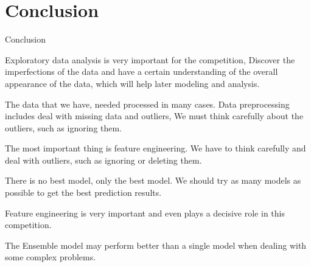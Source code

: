 \documentclass[
 size=12pt,
 paper=smartboard, %
 mode=present, %
 display=slides, %
 style=tuliplab,  %
 pauseslide,
 fleqn,leqno,clock]{powerdot}
\begin{document}
\section{Conclusion}

\begin{slide}[toc=,bm=]{Conclusion}
	\begin{description}
		\item Exploratory data analysis is
		      very important for the competition,
		      Discover the imperfections of the
		      data and have a certain understanding
		      of the overall appearance of the data,
		      which will help later modeling and analysis.
		\item The data that we have,
		      needed processed in many cases.
		      Data preprocessing includes
		      deal with missing data and outliers,
		      We must think carefully about the outliers,
		      such as ignoring them.
		\item The most important thing is
		      feature engineering.
		      We have to think carefully and
		      deal with outliers, such as ignoring
		      or deleting them.
		\item There is no best model,
		      only the best model. We should
		      try as many models as possible to
		      get the best prediction results.
		\item Feature engineering is very
		      important and even plays a decisive
		      role in this competition.
		\item The Ensemble model may perform better
		      than a single model when dealing
		      with some complex problems.
	\end{description}



\end{slide}

\begin{wideslide}[toc=,bm=]{}
	\centering
	\twocolumn[
		lcolwidth=0.35\linewidth,
		rcolwidth=0.65\linewidth
	]
	{
	}
	{


		\textcolor{black}{\scalebox{2.0}{Thank you \& Question}}


	}
\end{wideslide}
\end{document}
